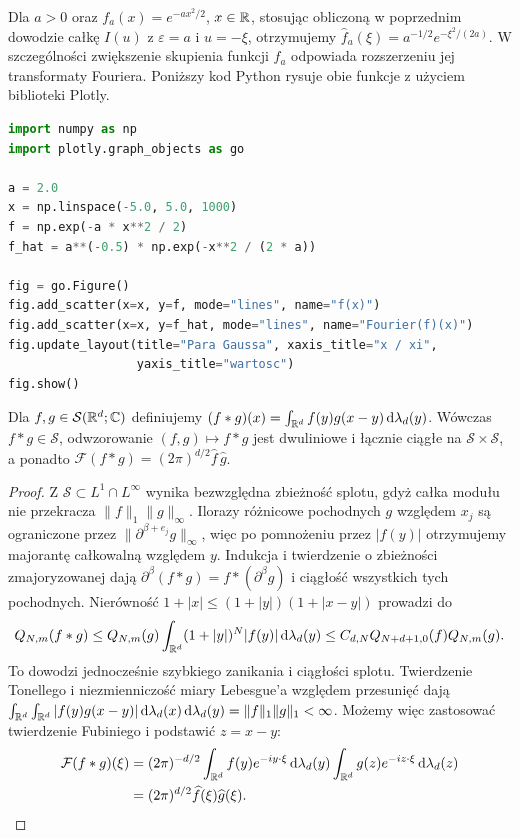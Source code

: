 \begin{przyklad}
\label{ex:fourier-gauss17}
Dla $a>0$ oraz $f_a(x)=e^{-ax^2/2}$, $x\in\mathbb R$,
stosując obliczoną w poprzednim dowodzie całkę $I(u)$
z $\varepsilon=a$ i $u=-\xi$, otrzymujemy
$\widehat f_a(\xi)=a^{-1/2}e^{-\xi^2/(2a)}$.
W szczególności zwiększenie skupienia funkcji $f_a$
odpowiada rozszerzeniu jej transformaty Fouriera.
Poniższy kod Python rysuje obie funkcje z użyciem biblioteki Plotly.
\begin{lstlisting}[language=Python,caption={Para funkcji Gaussa: funkcja i transformata Fouriera}]
import numpy as np
import plotly.graph_objects as go

a = 2.0
x = np.linspace(-5.0, 5.0, 1000)
f = np.exp(-a * x**2 / 2)
f_hat = a**(-0.5) * np.exp(-x**2 / (2 * a))

fig = go.Figure()
fig.add_scatter(x=x, y=f, mode="lines", name="f(x)")
fig.add_scatter(x=x, y=f_hat, mode="lines", name="Fourier(f)(x)")
fig.update_layout(title="Para Gaussa", xaxis_title="x / xi",
                  yaxis_title="wartosc")
fig.show()
\end{lstlisting}
\end{przyklad}

\begin{stwierdzenie}
\label{prop:convolution-schwartz17}
Dla $f,g\in\mathcal S(\mathbb R^d;\mathbb C)$ definiujemy
$(f*g)(x)=\int_{\mathbb R^d}f(y)g(x-y)\,\mathrm d\lambda_d(y)$.
Wówczas $f*g\in\mathcal S$, odwzorowanie
$(f,g)\mapsto f*g$ jest dwuliniowe i łącznie ciągłe
na $\mathcal S\times\mathcal S$, a ponadto
$\mathcal F(f*g)=(2\pi)^{d/2}\widehat f\,\widehat g$.
\end{stwierdzenie}
\begin{proof}
Z $\mathcal S\subset L^1\cap L^\infty$ wynika
bezwzględna zbieżność splotu, gdyż całka modułu
nie przekracza $\|f\|_1\|g\|_\infty$.
Ilorazy różnicowe pochodnych $g$ względem $x_j$
są ograniczone przez $\|\partial^{\beta+e_j}g\|_\infty$,
więc po pomnożeniu przez $|f(y)|$ otrzymujemy majorantę
całkowalną względem $y$. Indukcja i twierdzenie o zbieżności
zmajoryzowanej dają $\partial^\beta(f*g)=f*(\partial^\beta g)$
i ciągłość wszystkich tych pochodnych.
Nierówność $1+|x|\le(1+|y|)(1+|x-y|)$ prowadzi do
\[
 Q_{N,m}(f*g)\le Q_{N,m}(g)
 \int_{\mathbb R^d}(1+|y|)^N|f(y)|\,\mathrm d\lambda_d(y)
 \le C_{d,N}Q_{N+d+1,0}(f)Q_{N,m}(g).
\]
To dowodzi jednocześnie szybkiego zanikania i ciągłości
splotu. Twierdzenie Tonellego i niezmienniczość miary Lebesgue'a
względem przesunięć dają
$\int_{\mathbb R^d}\int_{\mathbb R^d}|f(y)g(x-y)|\,\mathrm d\lambda_d(x)
\,\mathrm d\lambda_d(y)=\|f\|_1\|g\|_1<\infty$.
Możemy więc zastosować twierdzenie Fubiniego i podstawić $z=x-y$:
\[
\begin{aligned}
\mathcal F(f*g)(\xi)
&=(2\pi)^{-d/2}
\int_{\mathbb R^d} f(y)e^{-iy\cdot\xi}\,\mathrm d\lambda_d(y)
\int_{\mathbb R^d}g(z)e^{-iz\cdot\xi}\,\mathrm d\lambda_d(z)\\
&=(2\pi)^{d/2}\widehat f(\xi)\widehat g(\xi).
\end{aligned}
\]
\end{proof}

